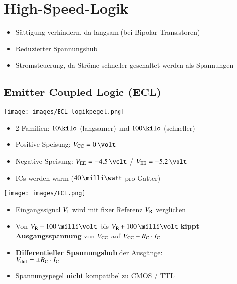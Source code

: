 \section{High-Speed-Logik}

\begin{itemize}
    \item Sättigung verhindern, da langsam (bei Bipolar-Transistoren)
    \item Reduzierter Spannungshub
    \item Stromsteuerung, da Ströme schneller geschaltet werden als Spannungen
\end{itemize}


\subsection{Emitter Coupled Logic (ECL)}

\begin{minipage}[c]{0.3\columnwidth}
    \texttt{[image: images/ECL\_logikpegel.png]}
\end{minipage}
\hfill
\begin{minipage}[c]{0.68\columnwidth}
    \begin{itemize}
        \item 2 Familien: $10 \kilo$ (langsamer) und $100 \kilo$ (schneller)
        \item Positive Speisung: $V_{\rm CC} = 0 \, \volt$
        \item Negative Speisung: $V_{\rm EE} = -4.5 \, \volt$ / $V_{\rm EE} = -5.2 \, \volt$ 
        \item ICs werden warm ($40 \, \milli \watt$ pro Gatter)
    \end{itemize}
\end{minipage}

\begin{minipage}[c]{0.25\columnwidth}
    \texttt{[image: images/ECL.png]}
\end{minipage}
\hfill
\begin{minipage}[c]{0.72\columnwidth}
   \begin{itemize}
    \item Eingangssignal $V_{\rm I}$ wird mit fixer Referenz $V_{\rm R}$ verglichen
    \item Von $V_{\rm R} - 100 \, \milli \volt$ bis $V_{\rm R} + 100 \, \milli \volt$ \textbf{kippt Ausgangsspannung} von $V_{\rm CC}$ auf $V_{\rm CC} - R_{\rm C} \cdot I_{\rm C}$
    \item \textbf{Differentieller Spannungshub} der Ausgänge:\\ $V_{\rm diff} = \pm R_{\rm C} \cdot I_{\rm C}$
    \item Spannungspegel \textbf{nicht} kompatibel zu CMOS / TTL
   \end{itemize}
\end{minipage}


